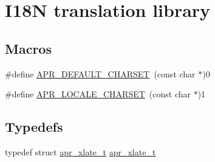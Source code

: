 \hypertarget{group___a_p_r___x_l_a_t_e}{\section{I18\-N translation library}
\label{group___a_p_r___x_l_a_t_e}
}
\subsection*{Macros}
\begin{DoxyCompactItemize}
\item 
\#define \hyperlink{group___a_p_r___x_l_a_t_e_ga3276c680eb0917ff51ff22c9b9959fa9}{A\-P\-R\-\_\-\-D\-E\-F\-A\-U\-L\-T\-\_\-\-C\-H\-A\-R\-S\-E\-T}~(const char $\ast$)0
\item 
\#define \hyperlink{group___a_p_r___x_l_a_t_e_ga0e46c333fb1c900f0dd4a78664f5a0de}{A\-P\-R\-\_\-\-L\-O\-C\-A\-L\-E\-\_\-\-C\-H\-A\-R\-S\-E\-T}~(const char $\ast$)1
\end{DoxyCompactItemize}
\subsection*{Typedefs}
\begin{DoxyCompactItemize}
\item 
typedef struct \hyperlink{group___a_p_r___x_l_a_t_e_ga069dabbadc30e3a4157c38104a250e77}{apr\-\_\-xlate\-\_\-t} \hyperlink{group___a_p_r___x_l_a_t_e_ga069dabbadc30e3a4157c38104a250e77}{apr\-\_\-xlate\-\_\-t}
\end{DoxyCompactItemize}
